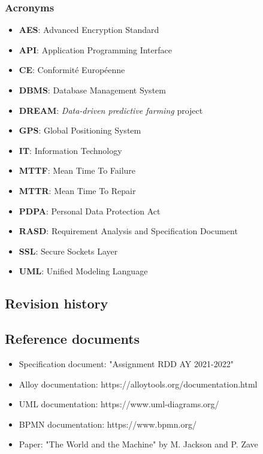 \documentclass[table, 12pt]{article}
\begin{document}
\subsubsection*{Acronyms}
\begin{itemize}
    \item \textbf{AES}: Advanced Encryption Standard
    \item \textbf{API}: Application Programming Interface
    \item \textbf{CE}: Conformité Européenne
    \item \textbf{DBMS}: Database Management System
    \item \textbf{DREAM}: \emph{Data-driven predictive farming} project
    \item \textbf{GPS}: Global Positioning System
    \item \textbf{IT}: Information Technology
    \item \textbf{MTTF}: Mean Time To Failure
    \item \textbf{MTTR}: Mean Time To Repair
    \item \textbf{PDPA}: Personal Data Protection Act 
    \item \textbf{RASD}: Requirement Analysis and Specification Document
    \item \textbf{SSL}: Secure Sockets Layer
    \item \textbf{UML}: Unified Modeling Language
\end{itemize}
\subsection{Revision history}
\subsection{Reference documents}
\begin{itemize}
    \item Specification document: "Assignment RDD AY 2021-2022"
    \item Alloy documentation: https://alloytools.org/documentation.html
    \item UML documentation: https://www.uml-diagrams.org/
    \item BPMN documentation: https://www.bpmn.org/
    \item Paper: "The World and the Machine" by M. Jackson and P. Zave   
\end{itemize}
\end{document}
